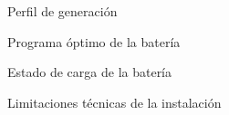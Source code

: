 \begin{figure}
  \centering
  \caption{Perfil de generación}
  \label{fig:perfil-generación}
\end{figure}

\begin{figure}
  \centering
  \caption{Programa óptimo de la batería}
  \label{fig:programa-óptimo}
\end{figure}

\begin{figure}
  \centering
  \caption{Estado de carga de la batería}
  \label{fig:soc-bess}
\end{figure}

\begin{figure}
  \centering
  \caption{Limitaciones técnicas de la instalación}
  \label{fig:limitaciones-técnicas}
\end{figure}
